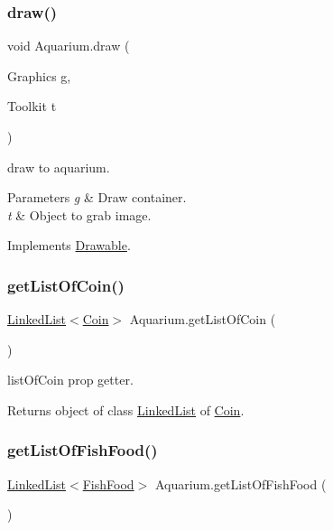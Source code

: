 \subsubsection{\texorpdfstring{draw()}{draw()}}
{\footnotesize\ttfamily void Aquarium.\+draw (\begin{DoxyParamCaption}\item[{Graphics}]{g,  }\item[{Toolkit}]{t }\end{DoxyParamCaption})\hspace{0.3cm}{\ttfamily [inline]}}

draw to aquarium. 
\begin{DoxyParams}{Parameters}
{\em g} & Draw container. \\
\hline
{\em t} & Object to grab image. \\
\hline
\end{DoxyParams}


Implements \mbox{\hyperlink{interface_drawable_aaddafb212b3c8e60fcc742052570c893}{Drawable}}.

\mbox{\label{class_aquarium_a9b0dec4c194324e6095b81262b042460}} 
\subsubsection{\texorpdfstring{get\+List\+Of\+Coin()}{getListOfCoin()}}
{\footnotesize\ttfamily \mbox{\hyperlink{class_linked_list}{Linked\+List}}$<$\mbox{\hyperlink{class_coin}{Coin}}$>$ Aquarium.\+get\+List\+Of\+Coin (\begin{DoxyParamCaption}{ }\end{DoxyParamCaption})\hspace{0.3cm}{\ttfamily [inline]}}

list\+Of\+Coin prop getter. \begin{DoxyReturn}{Returns}
object of class \mbox{\hyperlink{class_linked_list}{Linked\+List}} of \mbox{\hyperlink{class_coin}{Coin}}. 
\end{DoxyReturn}
\mbox{\label{class_aquarium_acfab5e8dd55512337ae91cf923e565e6}} 
\subsubsection{\texorpdfstring{get\+List\+Of\+Fish\+Food()}{getListOfFishFood()}}
{\footnotesize\ttfamily \mbox{\hyperlink{class_linked_list}{Linked\+List}}$<$\mbox{\hyperlink{class_fish_food}{Fish\+Food}}$>$ Aquarium.\+get\+List\+Of\+Fish\+Food (\begin{DoxyParamCaption}{ }\end{DoxyParamCaption})\hspace{0.3cm}{\ttfamily [inline]}}

